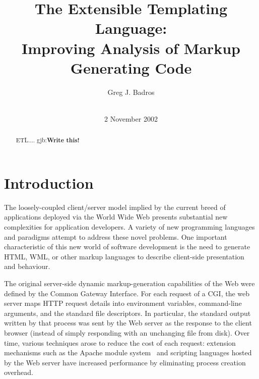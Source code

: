 \documentclass{www2003-submission}
\newcommand{\B}{\discretionary{}{}{}}
\newcommand{\gjb}[1]{{\sc gjb:}\textbf{#1}}
\begin{document}
%
\title{The Extensible Templating Language: \\
       Improving Analysis of Markup Generating Code}


\author{
%
\alignauthor Greg J. Badros\\
       \\
}
\date{2 November 2002}
\maketitle
\begin{abstract}
ETL.... \gjb{Write this!}

\end{abstract}




\section{Introduction}
\label{sec-intro}

The loosely-coupled client/\B{}server model implied by the current
breed of applications deployed via the World Wide Web presents
substantial new complexities for application developers. A variety of
new programming languages and paradigms attempt to address these novel
problems.  One important characteristic of this new world of software
development is the need to generate HTML, WML, or other markup
languages to describe client-side presentation and behaviour.

The original server-side dynamic markup-generation capabilities of the
Web were defined by the Common Gateway Interface.\cite{CGI} For each
request of a CGI, the web server maps HTTP request details into environment
variables, command-line arguments, and the standard file descriptors.
In particular, the standard output written by that process was sent by
the Web server as the response to the client browser (instead of
simply responding with an unchanging file from disk).  Over time,
various techniques arose to reduce the cost of each request: extension
mechanisms such as the Apache module system~\cite{ApacheModules} and
scripting languages hosted by the Web server have increased
performance by eliminating process creation overhead.
\end{document}
